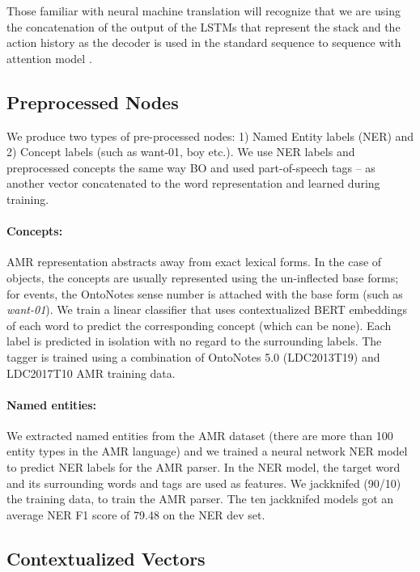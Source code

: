 \documentclass[11pt,a4paper]{article}
\begin{document}
Those familiar with neural machine translation will recognize that we are using the concatenation of the output of the LSTMs that represent the stack and the action history as the decoder is used in the standard sequence to sequence with attention model \cite{bahdanau2014neural}.

\subsection{Preprocessed Nodes}

We produce two types of pre-processed nodes: 1) Named Entity labels (NER) and 2) Concept labels (such as want-01, boy etc.). We use NER labels and preprocessed concepts the same way BO and  used part-of-speech tags -- as another vector concatenated to the word representation and learned during training.

\paragraph{Concepts:} AMR representation abstracts away from exact lexical forms. In the case of objects, the concepts are usually represented using the un-inflected base forms; for events, the OntoNotes sense number is attached with the base form (such as \emph{want-01}). We train a linear classifier that uses contextualized BERT embeddings \cite{devlin2018bert} of each word to predict the corresponding concept (which can be none). Each label is predicted in isolation with no regard to the surrounding labels. The tagger is trained using a combination of OntoNotes 5.0 (LDC2013T19) and LDC2017T10 AMR training data.




\paragraph{Named entities:} We extracted named entities from the AMR dataset (there are more than 100 entity types in the AMR language) and we trained a neural network NER model \cite{ni-dinu-florian:2017:Long} to predict NER labels for the AMR parser. In the NER model, the target word and its surrounding words and tags are used as features. We jackknifed (90/10) the training data, to train the AMR parser. The ten jackknifed models got an average NER F1 score of 79.48 on the NER dev set.

\subsection{Contextualized Vectors}
\end{document}

